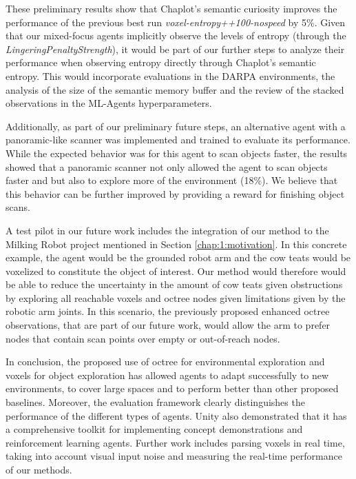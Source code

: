     These preliminary results show that Chaplot's semantic curiosity \cite{chaplot2020semantic} improves the performance of the previous best run \textit{voxel-entropy++100-nospeed} by 5\%. 
    Given that our mixed-focus agents implicitly observe the levels of entropy (through the \textit{LingeringPenaltyStrength}), it would be part of our further steps to analyze their performance when observing entropy directly through Chaplot's semantic entropy. 
    This would incorporate evaluations in the DARPA environments, the analysis of the size of the semantic memory buffer and the review of the stacked observations in the ML-Agents hyperparameters.
    
    Additionally, as part of our preliminary future steps, an alternative agent with a panoramic-like scanner was implemented and trained to evaluate its performance. While the expected behavior was for this agent to scan objects faster, the results showed that a panoramic scanner not only allowed the agent to scan objects faster and but also to explore more of the environment (18\%). We believe that this behavior can be further improved by providing a reward for finishing object scans.
    
    A test pilot in our future work includes the integration of our method to the Milking Robot project mentioned in Section \ref{chap:1:motivation}. In this concrete example, the agent would be the grounded robot arm and the cow teats would be voxelized to constitute the object of interest. Our method would therefore would be able to reduce the uncertainty in the amount of cow teats given obstructions by exploring all reachable voxels and octree nodes given limitations given by the robotic arm joints.
    In this scenario, the previously proposed enhanced octree observations, that are part of our future work, would allow the arm to prefer nodes that contain scan points over empty or out-of-reach nodes. 
    
    In conclusion, the proposed use of octree for environmental exploration and voxels for object exploration has allowed agents to adapt successfully to new environments, to cover large spaces and to perform better than other proposed baselines. Moreover, the evaluation framework clearly distinguishes the performance of the different types of agents. Unity also demonstrated that it has a comprehensive toolkit for implementing concept demonstrations and reinforcement learning agents. Further work includes parsing voxels in real time, taking into account visual input noise and measuring the real-time performance of our methods.


